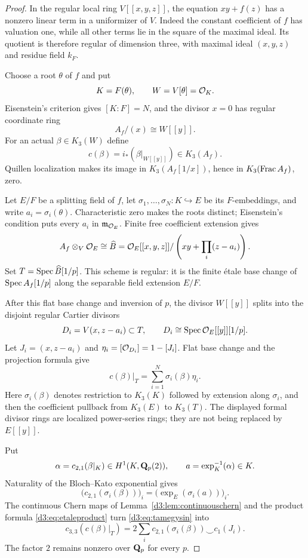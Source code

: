 \begin{proof}
In the regular local ring $V[[x,y,z]]$, the equation $xy+f(z)$ has a nonzero linear term in a uniformizer of $V$. Indeed the constant coefficient of $f$ has valuation one, while all other terms lie in the square of the maximal ideal. Its quotient is therefore regular of dimension three, with maximal ideal $(x,y,z)$ and residue field $k_F$.

Choose a root $\theta$ of $f$ and put
\[
K=F(\theta),\qquad W=V[\theta]=\mathcal O_K.
\]
Eisenstein's criterion gives $[K:F]=N$, and the divisor $x=0$ has regular coordinate ring
\[
A_f/(x)\cong W[[y]].
\]
For an actual $\beta\in K_3(W)$ define
\[
c(\beta)=i_*(\beta|_{W[[y]]})\in K_3(A_f).
\]
Quillen localization \cite{Quillen} makes its image in $K_3(A_f[1/x])$, hence in $K_3(\operatorname{Frac} A_f)$, zero.

Let $E/F$ be a splitting field of $f$, let $\sigma_1,\ldots,\sigma_N:K\hookrightarrow E$ be its $F$-embeddings, and write $a_i=\sigma_i(\theta)$. Characteristic zero makes the roots distinct; Eisenstein's condition puts every $a_i$ in $\mathfrak m_{\mathcal O_E}$. Finite free coefficient extension gives
\[
A_f\otimes_V\mathcal O_E
\cong
\widehat B=\mathcal O_E[[x,y,z]]/
\left(xy+\prod_i(z-a_i)\right).
\]
Set $T=\operatorname{Spec}\widehat B[1/p]$. This scheme is regular: it is the finite \'etale base change of $\operatorname{Spec} A_f[1/p]$ along the separable field extension $E/F$.

After this flat base change and inversion of $p$, the divisor $W[[y]]$ splits into the disjoint regular Cartier divisors
\[
D_i=V(x,z-a_i)\subset T,\qquad
D_i\cong\operatorname{Spec}\mathcal O_E[[y]][1/p].
\]
Let $J_i=(x,z-a_i)$ and $\eta_i=[\mathcal O_{D_i}]=1-[J_i]$. Flat base change and the projection formula give
\begin{equation}\label{d3:eq:tamegysin}
c(\beta)|_T=\sum_{i=1}^N\sigma_i(\beta)\eta_i.
\end{equation}
Here $\sigma_i(\beta)$ denotes restriction to $K_3(K)$ followed by extension along $\sigma_i$, and then the coefficient pullback from $K_3(E)$ to $K_3(T)$. The displayed formal divisor rings are localized power-series rings; they are not being replaced by $E[[y]]$.

Put
\[
\alpha=c_{2,1}(\beta|_K)\in H^1(K,\mathbf Q_p(2)),
\qquad a=\exp_K^{-1}(\alpha)\in K.
\]
Naturality of the Bloch--Kato exponential gives
\begin{equation}\label{d3:eq:tamecoefficientvector}
\bigl(c_{2,1}(\sigma_i(\beta))\bigr)_i
=\bigl(\exp_E(\sigma_i(a))\bigr)_i.
\end{equation}
The continuous Chern maps of Lemma~\ref{d3:lem:continuouschern} and the product formula \eqref{d3:eq:etaleproduct} turn \eqref{d3:eq:tamegysin} into
\[
c_{3,3}(c(\beta)|_T)
=2\sum_i c_{2,1}(\sigma_i(\beta))\smile c_1(J_i).
\]
The factor $2$ remains nonzero over $\mathbf Q_p$ for every $p$.


\end{proof}

